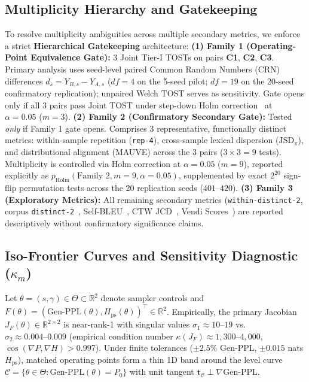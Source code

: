 \documentclass[11pt,a4paper]{article}
\begin{document}
\subsection{Multiplicity Hierarchy and Gatekeeping}
To resolve multiplicity ambiguities across multiple secondary metrics, we enforce a strict \textbf{Hierarchical Gatekeeping} architecture: \textbf{(1) Family 1 (Operating-Point Equivalence Gate):} 3 Joint Tier-I TOSTs on pairs \textbf{C1}, \textbf{C2}, \textbf{C3}. Primary analysis uses seed-level paired Common Random Numbers (CRN) differences $d_s = Y_{B,s} - Y_{A,s}$ ($df=4$ on the 5-seed pilot; $df=19$ on the 20-seed confirmatory replication); unpaired Welch TOST serves as sensitivity. Gate opens only if all 3 pairs pass Joint TOST under step-down Holm correction~\citep{holm1979simple} at $\alpha=0.05$ ($m=3$). \textbf{(2) Family 2 (Confirmatory Secondary Gate):} Tested \emph{only} if Family 1 gate opens. Comprises 3 representative, functionally distinct metrics: within-sample repetition (\texttt{rep-4}), cross-sample lexical dispersion ($\mathrm{JSD}_\pi$), and distributional alignment (MAUVE) across the 3 pairs ($3 \times 3 = 9$ tests). Multiplicity is controlled via Holm correction at $\alpha=0.05$ ($m=9$), reported explicitly as $p_{\mathrm{Holm}}(\text{Family 2}, m=9, \alpha=0.05)$, supplemented by exact $2^{20}$ sign-flip permutation tests across the 20 replication seeds ($401\text{--}420$). \textbf{(3) Family 3 (Exploratory Metrics):} All remaining secondary metrics (\texttt{within-distinct-2}, corpus \texttt{distinct-2}~\citep{li2016diversity}, Self-BLEU~\citep{zhu2018texygen}, CTW JCD~\citep{willems1995context}, Vendi Scores~\citep{friedman2023vendi}) are reported descriptively without confirmatory significance claims.

\subsection{Iso-Frontier Curves and Sensitivity Diagnostic (\texorpdfstring{$\kappa_m$}{kappa})}
Let $\theta = (s, \gamma) \in \Theta \subset \mathbb{R}^2$ denote sampler controls and $F(\theta) = (\mathrm{Gen\text{-}PPL}(\theta), H_{\mathrm{ps}}(\theta))^\top \in \mathbb{R}^2$. Empirically, the primary Jacobian $J_F(\theta) \in \mathbb{R}^{2 \times 2}$ is near-rank-1 with singular values $\sigma_1 \approx 10\text{--}19$ vs.\ $\sigma_2 \approx 0.004\text{--}0.009$ (empirical condition number $\kappa(J_F) \approx 1{,}300\text{--}4{,}000$, $\cos(\nabla P, \nabla H) > 0.997$). Under finite tolerances ($\pm 2.5\%$ Gen-PPL, $\pm 0.015$ nats $H_{\mathrm{ps}}$), matched operating points form a thin 1D band around the level curve $\mathcal{C} = \{\theta \in \Theta : \mathrm{Gen\text{-}PPL}(\theta) = P_0\}$ with unit tangent $\mathbf{t}_{\mathcal{C}} \perp \nabla\mathrm{Gen\text{-}PPL}$.
\end{document}
